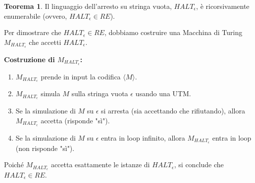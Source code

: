 \documentclass[a4paper]{article}
\makeatletter
\theoremstyle{definition} %
\newtheorem{theorem}{Teorema}
[section] %
\renewenvironment{proof}[1][\proofname]{\par
  \pushQED{\qed}%
  \normalfont \topsep6\p@\@plus6\p@\relax
  \trivlist
  \item[\hskip\labelsep
        \bfseries
    #1\@addpunct{.}]\ignorespaces
}{%
  \popQED\endtrivlist\@endpefalse
}
\makeatother
\begin{document}
\begin{theorem}
Il linguaggio dell'arresto su stringa vuota, $HALT_\epsilon$, è ricorsivamente enumerabile (ovvero, $HALT_\epsilon \in RE$).
\end{theorem}
\begin{proof}
Per dimostrare che $HALT_\epsilon \in RE$, dobbiamo costruire una Macchina di Turing $M_{HALT_\epsilon}$ che accetti $HALT_\epsilon$.

\textbf{Costruzione di $M_{HALT_\epsilon}$:}
\begin{enumerate}
    \item $M_{HALT_\epsilon}$ prende in input la codifica $\langle M \rangle$.
    \item $M_{HALT_\epsilon}$ simula $M$ sulla stringa vuota $\epsilon$ usando una UTM.
    \item Se la simulazione di $M$ su $\epsilon$ si arresta (sia accettando che rifiutando), allora $M_{HALT_\epsilon}$ accetta (risponde "sì").
    \item Se la simulazione di $M$ su $\epsilon$ entra in loop infinito, allora $M_{HALT_\epsilon}$ entra in loop (non risponde "sì").
\end{enumerate}
Poiché $M_{HALT_\epsilon}$ accetta esattamente le istanze di $HALT_\epsilon$, si conclude che $HALT_\epsilon \in RE$.
\end{proof}
\end{document}
